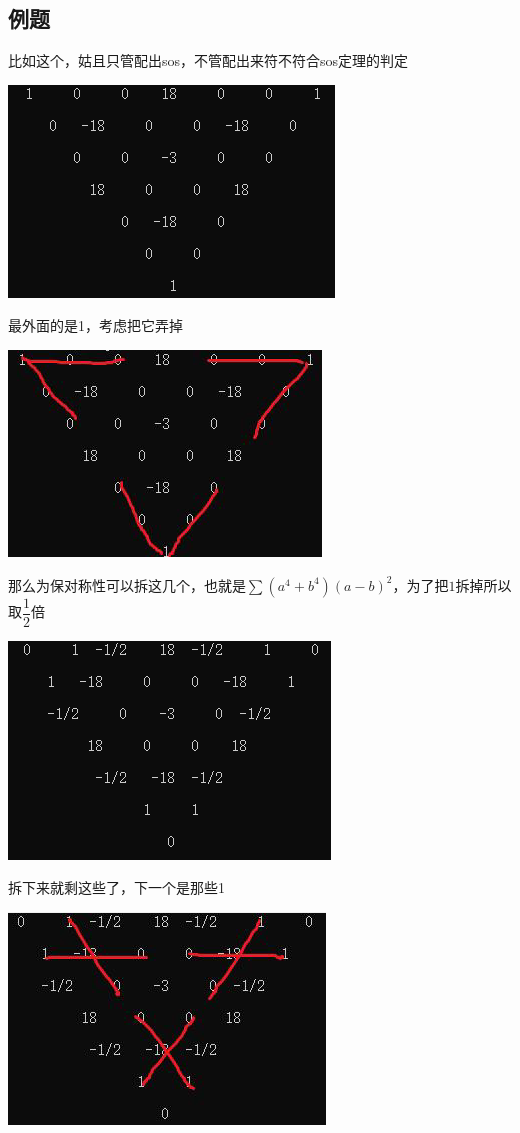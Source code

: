 \documentclass[UTF8]{ctexart}
\begin{document}
\subsection{例题}
比如这个，姑且只管配出sos，不管配出来符不符合sos定理的判定
\begin{center}
	\includegraphics[width=0.5\linewidth]{0382}
\end{center}
最外面的是1，考虑把它弄掉
\begin{center}
	\includegraphics[width=0.5\linewidth]{0383}
\end{center}
那么为保对称性可以拆这几个，也就是$ \displaystyle \sum (a^4+b^4)(a-b)^2 $，为了把$ 1 $拆掉所以取$ \dfrac{1}{2} $倍
\begin{center}
	\includegraphics[width=0.5\linewidth]{0384}
\end{center}
拆下来就剩这些了，下一个是那些1
\begin{center}
	\includegraphics[width=0.5\linewidth]{0385}
\end{center}
\end{document}
